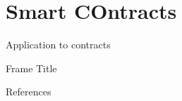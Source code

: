 \documentclass{beamer}
\begin{document}
\section{Smart COntracts}
\begin{frame}{Application to contracts}
    
\end{frame}
\begin{frame}{Frame Title}
    
\end{frame}
\begin{frame}{References}
 
   
\end{frame}
\end{document}
